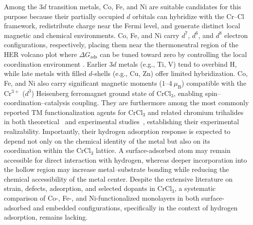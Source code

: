 \documentclass[journal=jacsat,manuscript=article]{achemso}
\begin{document}
Among the $3d$ transition metals, Co, Fe, and Ni are suitable candidates for this purpose because their partially occupied $d$ orbitals can hybridize with the Cr--Cl framework, redistribute charge near the Fermi level, and generate distinct local magnetic and chemical environments. Co, Fe, and Ni carry $d^7$, $d^6$, and $d^8$ electron configurations, respectively, placing them near the thermoneutral region of the HER volcano plot where $\Delta G_{\mathrm{ads}}$ can be tuned toward zero by controlling the local coordination environment \cite{Norskov_2005,Moraes2026}. Earlier $3d$ metals (e.g., Ti, V) tend to overbind H, while late metals with filled $d$-shells (e.g., Cu, Zn) offer limited hybridization. Co, Fe, and Ni also carry significant magnetic moments ($1$--$4~\mu_{\mathrm{B}}$) compatible with the Cr$^{3+}$ ($d^3$) Heisenberg ferromagnet ground state of CrCl$_3$, enabling spin--coordination--catalysis coupling. They are furthermore among the most commonly reported TM functionalization agents for CrCl$_3$ and related chromium trihalides in both theoretical~\cite{Luo2020,Gao2018} and experimental studies~\cite{Mastrippolito2021,Abdel-Hafiez2025}, establishing their experimental realizability. Importantly, their hydrogen adsorption response is expected to depend not only on the chemical identity of the metal but also on its coordination within the CrCl$_3$ lattice. A surface-adsorbed atom may remain accessible for direct interaction with hydrogen, whereas deeper incorporation into the hollow region may increase metal--substrate bonding while reducing the chemical accessibility of the metal center. Despite the extensive literature on strain, defects, adsorption, and selected dopants in CrCl$_3$, a systematic comparison of Co-, Fe-, and Ni-functionalized monolayers in both surface-adsorbed and embedded configurations, specifically in the context of hydrogen adsorption, remains lacking.
\end{document}
